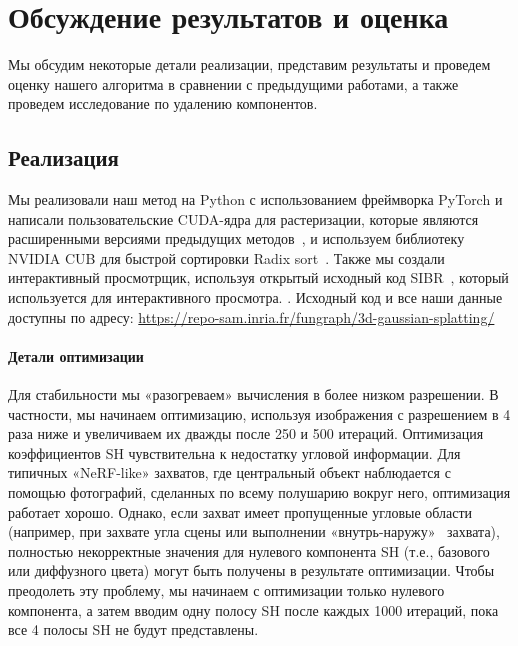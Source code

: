 \section{Обсуждение результатов и оценка}
Мы обсудим некоторые детали реализации, представим результаты и проведем оценку нашего алгоритма в сравнении с предыдущими работами, а также проведем исследование по удалению компонентов.

\subsection{Реализация}
\label{sec:impl}
Мы реализовали наш метод на Python с использованием фреймворка PyTorch и написали пользовательские CUDA-ядра для растеризации, которые являются расширенными версиями предыдущих методов~\cite{kopanas21}, и используем библиотеку NVIDIA CUB для быстрой сортировки Radix sort~\cite{merrill2010revisiting}.
Также мы создали интерактивный просмотрщик, используя открытый исходный код SIBR~\cite{sibr2020}, который используется для интерактивного просмотра. .
Исходный код и все наши данные доступны по адресу: \textcolor{blue}{\url{https://repo-sam.inria.fr/fungraph/3d-gaussian-splatting/}} 

\paragraph{Детали оптимизации}
Для стабильности мы «разогреваем» вычисления в более низком разрешении.
В частности, мы начинаем оптимизацию, используя изображения с разрешением в 4 раза ниже и увеличиваем их дважды после 250 и 500 итераций.
Оптимизация коэффициентов SH чувствительна к недостатку угловой информации. Для типичных «NeRF-like»
захватов, где центральный объект наблюдается с помощью фотографий, сделанных по всему полушарию вокруг него, оптимизация работает хорошо. Однако, если захват имеет пропущенные угловые области (например, при захвате угла сцены или выполнении «внутрь-наружу»~\cite{HRDB16} захвата), полностью некорректные значения для нулевого компонента SH (т.е., базового или диффузного цвета) могут быть получены в результате оптимизации.
Чтобы преодолеть эту проблему, мы начинаем с оптимизации только нулевого компонента, а затем вводим одну полосу SH после каждых 1000 итераций, пока все 4 полосы SH не будут представлены. %

